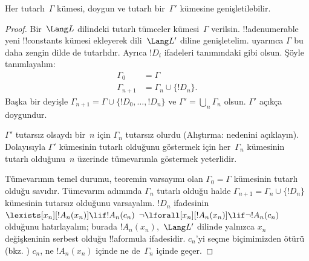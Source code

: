 \begin{lem}
Her tutarlı~$\Gamma$ kümesi, doygun ve tutarlı bir~$\Gamma'$ kümesine
genişletilebilir.
\end{lem}

\begin{proof}
Bir~$\Lang L$ dilindeki tutarlı tümceler kümesi~$\Gamma$ verilsin.
!!a{denumerable} yeni !!{constant}s kümesi ekleyerek
dili~$\Lang L'$ diline genişletelim.  uyarınca
$\Gamma$ bu daha zengin dilde de tutarlıdır. Ayrıca $!D_i$ ifadeleri
 tanımındaki gibi olsun. Şöyle tanımlayalım:
\begin{align*}
\Gamma_0 & = \Gamma \\
\Gamma_{n+1} & = \Gamma_n \cup \{!D_n \}.
\end{align*}
Başka bir deyişle $\Gamma_{n+1}=\Gamma\cup\{!D_0,\dots,!D_n\}$ ve
$\Gamma'=\bigcup_n\Gamma_n$ olsun. $\Gamma'$ açıkça doygundur.

$\Gamma'$ tutarsız olsaydı bir~$n$ için $\Gamma_n$ tutarsız olurdu
(Alıştırma: nedenini açıklayın). Dolayısıyla $\Gamma'$ kümesinin
tutarlı olduğunu göstermek için her~$\Gamma_n$ kümesinin tutarlı
olduğunu~$n$ üzerinde tümevarımla göstermek yeterlidir.

Tümevarımın temel durumu, teoremin varsayımı olan $\Gamma_0=\Gamma$
kümesinin tutarlı olduğu savıdır. Tümevarım adımında $\Gamma_n$
tutarlı olduğu halde $\Gamma_{n+1}=\Gamma_n\cup\{!D_n\}$ kümesinin
tutarsız olduğunu varsayalım. $!D_n$ ifadesinin
{$\lexists[x_n][!A_n(x_n)]\lif !A_n(c_n)$}
{$\lnot\lforall[x_n][!A_n(x_n)]\lif\lnot !A_n(c_n)$}
olduğunu hatırlayalım; burada $!A_n(x_n)$,~$\Lang L'$ dilinde yalnızca
$x_n$ değişkeninin serbest olduğu !!a{formula} ifadesidir.
$c_n$'yi seçme biçimimizden ötürü (bkz. )
$c_n$, ne $!A_n(x_n)$ içinde ne de~$\Gamma_n$ içinde geçer.


\end{proof}
